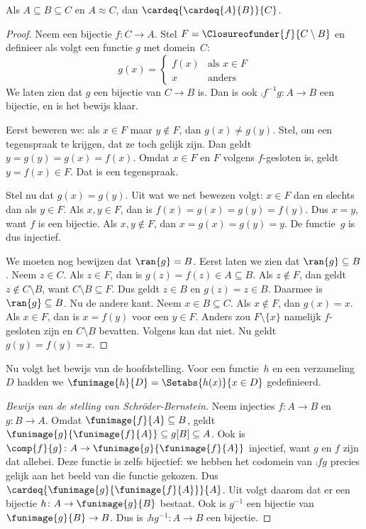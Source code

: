 \documentclass[../../../include/open-logic-section]{subfiles}
\begin{document}
\begin{prop}
Als $A \subseteq B \subseteq C$ en $A \approx C$, dan $\cardeq{\cardeq{A}{B}}{C}$.
\end{prop}

\begin{proof}
Neem een bijectie $f \colon C \to A$. Stel $F =
\Closureofunder{f}{C \setminus B}$ en definieer als volgt een functie
$g$ met domein~$C$:
\[
	g(x) =
	\begin{cases}
			f(x) &\text{als $x \in F$}\\
			x & \text{anders}
		\end{cases}
\]
We laten zien dat $g$ een bijectie van $C \to B$ is. Dan is ook
$\comp{f^{-1}}{g} \colon A \to B$ een bijectie, en is het bewijs
klaar.

Eerst beweren we: als $x \in F$ maar $y\notin F$, dan $g(x) \neq g(y)$.
Stel, om een tegenspraak te krijgen, dat ze toch gelijk zijn. Dan geldt
$y = g(y) = g(x) = f(x)$. Omdat $x \in F$ en $F$ volgens
 $f$-gesloten is, geldt $y = f(x) \in F$. Dat is
een tegenspraak.

Stel nu dat $g(x) = g(y)$. Uit wat we net bewezen volgt: $x \in F$ dan
en slechts dan als $y \in F$. Als $x, y \in F$, dan is $f(x) = g (x)
= g(y) = f(y)$. Dus $x = y$, want $f$ is een bijectie. Als
$x, y \notin F$, dan $x = g(x) = g(y) = y$. De functie~$g$ is dus
injectief.

We moeten nog bewijzen dat $\ran{g} = B$. Eerst laten we zien dat
$\ran{g} \subseteq B$. Neem $z \in C$. Als $z \in F$, dan is
$g(z) = f(z) \in A \subseteq B$. Als $z \notin F$, dan geldt
$z \notin C \setminus B$, want $C \setminus B \subseteq F$. Dus geldt
$z \in B$ en $g(z) = z \in B$. Daarmee is
$\ran{g} \subseteq B$. Nu de andere kant. Neem $x \in B \subseteq C$.
Als $x \notin F$, dan $g(x) = x$.
Als $x \in F$, dan is $x = f(y)$ voor een $y \in F$. Anders zou
$F \setminus \{x\}$ namelijk $f$-gesloten zijn en $C\setminus B$
bevatten. Volgens  kan dat niet. Nu geldt
$g(y) = f(y) = x$.
\end{proof}

Nu volgt het bewijs van de hoofdstelling. Voor een functie~$h$ en een
verzameling~$D$ hadden we $\funimage{h}{D} = \Setabs{h(x)}{x \in D}$
gedefinieerd.

\begin{proof}[Bewijs van de stelling van Schr\"oder-Bernstein] Neem
injecties $f \colon A \to B$ en $g \colon B \to A$. Omdat
$\funimage{f}{A} \subseteq B$, geldt
$\funimage{g}{\funimage{f}{A}} \subseteq g[B] \subseteq A$. Ook is
$\comp{f}{g} \colon A \to \funimage{g}{\funimage{f}{A}}$ injectief,
want $g$ en $f$ zijn dat allebei. Deze functie is zelfs bijectief: we
hebben het codomein van $\comp{f}{g}$ precies gelijk aan het beeld van
die functie gekozen. Dus
$\cardeq{\funimage{g}{\funimage{f}{A}}}{A}$. Uit
 volgt daarom dat er een bijectie $h \colon A \to
\funimage{g}{B}$ bestaat. Ook is $g^{-1}$ een bijectie van
$\funimage{g}{B} \to B$. Dus is $\comp{h}{g^{-1}} \colon A \to B$
een bijectie.
\end{proof}
\end{document}
